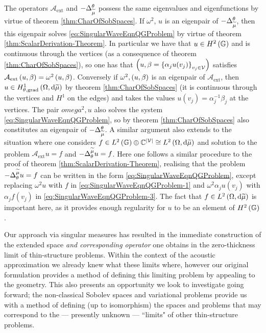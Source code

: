 The operators $\mathcal{A}_{\mathrm{ext}}$ and $-\Delta_{\widetilde{\mu}}^{\theta}$ possess the same eigenvalues and eigenfunctions by virtue of theorem \ref{thm:CharOfSobSpaces}.
If $\omega^2$, $u$ is an eigenpair of $-\Delta_{\widetilde{\mu}}^{\theta}$, then this eigenpair solves \eqref{eq:SingularWaveEqnQGProblem} by virtue of theorem \ref{thm:ScalarDerivation-Theorem}.
In particular we have that $u\in H^2\left( \mathbb{G} \right)$ and is continuous through the vertices (as a consequence of theorem \ref{thm:CharOfSobSpaces}), so one has that $\left( u,\beta = \left\{ \alpha_j u(v_j) \right\}_{v_j\in\mathcal{V}} \right)$ satisfies $\mathcal{A}_{\mathrm{ext}}\left( u,\beta \right) = \omega^2\left( u,\beta \right)$.
Conversely if $\omega^2, \left( u,\beta \right)$ is an eigenpair of $\mathcal{A}_{\mathrm{ext}}$, then $u\in H^1_{\theta, \mathrm{grad}}\left( \Omega, \mathrm{d}\widetilde{\mu} \right)$ by theorem \ref{thm:CharOfSobSpaces} (it is continuous through the vertices and $H^1$ on the edges) and takes the values $u(v_j) = \alpha_j^{-1}\beta_j$ at the vertices.
The pair $omega^2, u$ also solves the system \eqref{eq:SingularWaveEqnQGProblem}, so by theorem \ref{thm:CharOfSobSpaces} also constitutes an eigenpair of $-\Delta_{\widetilde{\mu}}^{\theta}$.
A similar argument also extends to the situation where one considers $f\in L^2\left( \mathbb{G} \right)\oplus\mathbb{C}^{\left\lvert \mathcal{V} \right\rvert} \cong L^{2}\left( \Omega,\mathrm{d} \widetilde{\mu} \right)$ and solution to the problem $\mathcal{A}_{\mathrm{ext}}u=f$ and $-\Delta_{\theta}^{\widetilde{\mu}}u=f$. 
Here one follows a similar procedure to the proof of theorem \ref{thm:ScalarDerivation-Theorem}, realising that the problem $-\Delta_{\theta}^{\widetilde{\mu}}u=f$ can be written in the form \eqref{eq:SingularWaveEqnQGProblem}, except replacing $\omega^2 u$ with $f$ in \eqref{eq:SingularWaveEqnQGProblem-1} and $\omega^2\alpha_j u(v_j)$ with $\alpha_j f(v_j)$ in \eqref{eq:SingularWaveEqnQGProblem-3}.
The fact that $f\in L^{2}\left( \Omega,\mathrm{d} \widetilde{\mu} \right)$ is important here, as it provides enough regularity for $u$ to be an element of $H^2\left( \mathbb{G} \right)$.

Our approach via singular measures has resulted in the immediate construction of the extended space \emph{and corresponding operator} one obtains in the zero-thickness limit of thin-structure problems.
Within the context of the acoustic approximation we already knew what these limits where, however our original formulation provides a method of defining this limiting problem by appealing to the geometry.
This also presents an opportunity we look to investigate going forward; the non-classical Sobolev spaces and variational problems provide us with a method of defining (up to isomorphism) the spaces and problems that may correspond to the --- presently unknown --- ``limits" of other thin-structure problems.